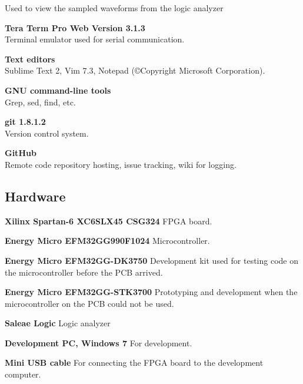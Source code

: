 \begin{description}
        Used to view the sampled waveforms from the logic analyzer
    \item{\textbf{Tera Term Pro Web Version 3.1.3}} \\
        Terminal emulator used for serial communication.
    \item{\textbf{Text editors}} \\
        Sublime Text 2, Vim 7.3, Notepad (©Copyright Microsoft Corporation).
    \item{\textbf{GNU command-line tools}} \\
        Grep, sed, find, etc.
    \item{\textbf{git 1.8.1.2}} \\
        Version control system.
    \item{\textbf{GitHub}} \\
        Remote code repository hosting, issue tracking, wiki for logging.
\end{description}

\subsection{Hardware}
\begin{description}
\item{\textbf{Xilinx Spartan-6 XC6SLX45 CSG324}}
    FPGA board.
\item{\textbf{Energy Micro EFM32GG990F1024}}
    Microcontroller.
\item{\textbf{Energy Micro EFM32GG-DK3750}}
    Development kit used for testing code on the microcontroller before the PCB arrived.
\item{\textbf{Energy Micro EFM32GG-STK3700}}
    Prototyping and development when the microcontroller on the PCB could not be used.
\item{\textbf{Saleae Logic}}
    Logic analyzer
\item{\textbf{Development PC, Windows 7}}
    For development.
\item{\textbf{Mini USB cable}}
    For connecting the FPGA board to the development computer.
\end{description}
